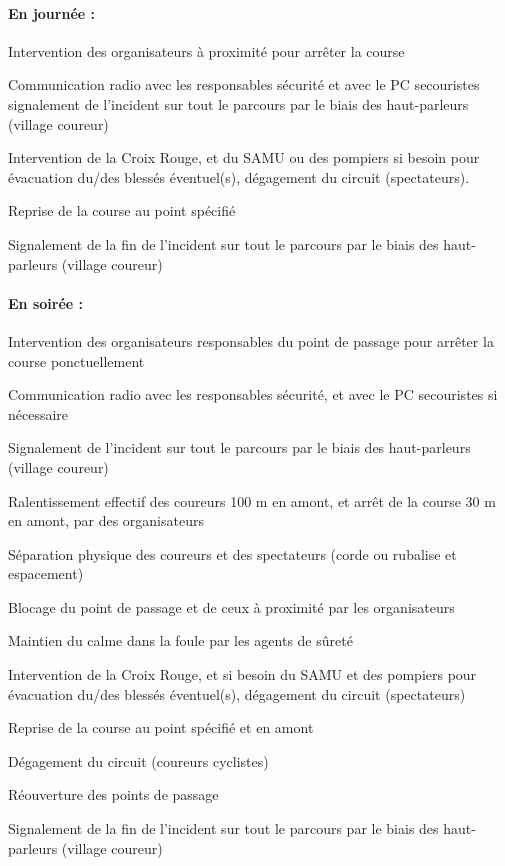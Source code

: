 \documentclass[hidelinks, paper=a4, fontsize=13pt]{report}
\begin{document}
\paragraph{En journée :}
\begin{list}{•}{}
\item Intervention des organisateurs à proximité pour arrêter la course
\item Communication radio avec les responsables sécurité et avec le PC secouristes signalement de l’incident sur tout le parcours par le biais des haut-parleurs (village coureur)
\item Intervention de la Croix Rouge, et du SAMU ou des pompiers si besoin pour évacuation du/des blessés éventuel(s), dégagement du circuit (spectateurs).
\item Reprise de la course au point spécifié
\item Signalement de la fin de l’incident sur tout le parcours par le biais des haut-parleurs (village coureur)
\end{list}


\paragraph{En soirée :}
\begin{list}{•}{}
\item Intervention des organisateurs responsables du point de passage pour arrêter la course ponctuellement 
\item Communication radio avec les responsables sécurité, et avec le PC secouristes si nécessaire
\item Signalement de l’incident sur tout le parcours par le biais des haut-parleurs (village coureur)
\item Ralentissement effectif des coureurs 100 m en amont, et arrêt de la course  30 m en amont, par des organisateurs
\item Séparation physique des coureurs et des spectateurs (corde ou rubalise et espacement)
\item Blocage du point de passage et de ceux à proximité par les organisateurs
\item Maintien du calme dans la foule par les agents de sûreté
\item Intervention de la Croix Rouge, et si besoin du SAMU et des pompiers pour évacuation du/des blessés éventuel(s), dégagement du circuit (spectateurs)
\item Reprise de la course au point spécifié et en amont
\item Dégagement du circuit (coureurs cyclistes)
\item Réouverture des points de passage
\item Signalement de la fin de l’incident sur tout le parcours par le biais des haut-parleurs (village coureur)
\end{list}
\newpage
\end{document}
